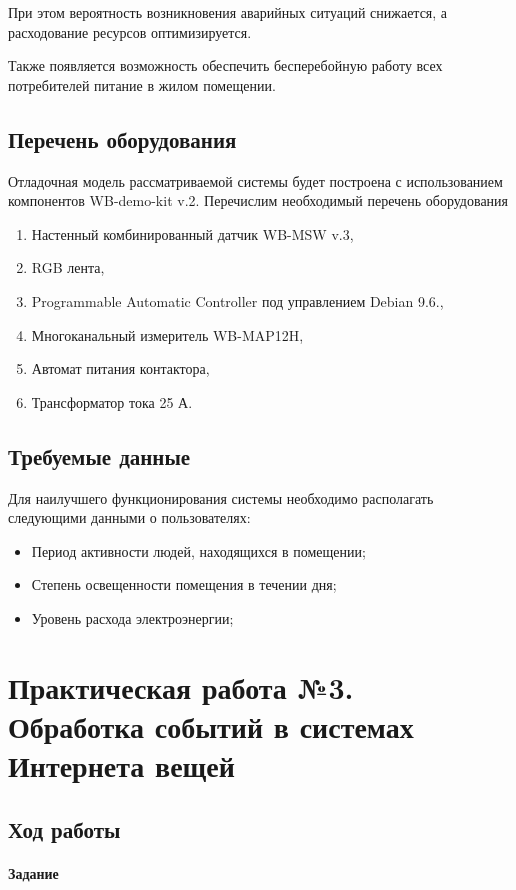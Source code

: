 \documentclass[a4paper,14pt]{extarticle}
\begin{document}
При этом вероятность возникновения аварийных ситуаций снижается, а расходование ресурсов оптимизируется.

Также появляется возможность обеспечить бесперебойную работу всех потребителей питание в жилом помещении.

\subsection{Перечень оборудования}
Отладочная модель рассматриваемой системы будет построена с использованием компонентов WB-demo-kit v.2. Перечислим необходимый перечень оборудования
\begin{enumerate}
	\item Настенный комбинированный датчик WB-MSW v.3,
	\item RGB лента,
	\item Programmable Automatic Controller под управлением Debian 9.6.,
	\item Многоканальный измеритель WB-MAP12H,
	\item Автомат питания контактора,
	\item Трансформатор тока 25 А.
\end{enumerate}

\subsection{Требуемые данные} 
Для наилучшего функционирования системы необходимо располагать следующими данными о пользователях:
\begin{itemize}
	\item Период активности людей, находящихся в помещении;
	\item Степень освещенности помещения в течении дня;
	\item Уровень расхода электроэнергии;
\end{itemize}
\newpage

\section{Практическая работа №3. \\Обработка событий в системах\\Интернета вещей}

\subsection{Ход работы}

\paragraph {Задание}
\end{document}
